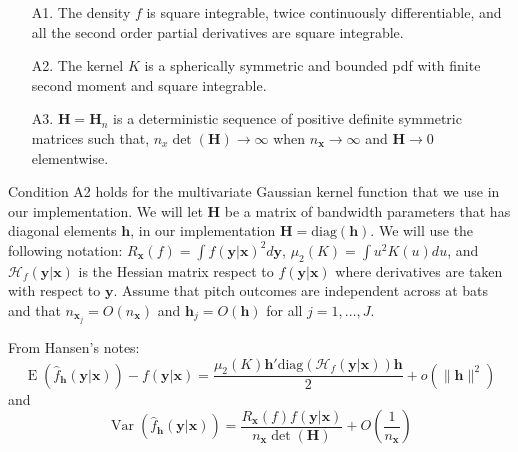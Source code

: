 \documentclass[11pt]{article}
\newcommand{\Hcal}{\mathcal{H}}
\newcommand{\Hbf}{\textbf{H}}
\newcommand{\y}{\textbf{y}}
\newcommand{\x}{\textbf{x}}
\newcommand{\h}{\textbf{h}}
\DeclareMathOperator{\E}{E}
\DeclareMathOperator{\Var}{Var}
\begin{document}
\begin{itemize}
\item[A1.] The density $f$ is square integrable, twice continuously differentiable, and all the second order partial derivatives are square integrable.
\item[A2.] The kernel $K$ is a spherically symmetric and bounded pdf with finite second moment and square integrable.
\item[A3.] $\Hbf = \Hbf_n$ is a deterministic sequence of positive definite symmetric matrices such that, $n_x\det(\Hbf) \to \infty$ when $n_\x \to \infty$ and $\Hbf \to 0$ elementwise. 
\end{itemize}

Condition A2 holds for the multivariate Gaussian kernel function that we use in our implementation.
We will let $\Hbf$ be a matrix of bandwidth parameters that has diagonal elements $\h$, in our implementation $\Hbf = \text{diag}(\h)$. We will use the following notation: $R_{\x}(f) = \int f(\y|\x)^2 d\y$, $\mu_2(K) = \int u^2K(u)du$, and $\Hcal_f(\y|\x)$ is the Hessian matrix respect to $f(\y|\x)$ where derivatives are taken with respect to $\y$. Assume that pitch outcomes are independent across at bats and that $n_{\x_j} = O(n_\x)$ and $\h_j = O(\h)$ for all $j = 1,\ldots,J$. 

From Hansen's notes: 
$$
  \E(\hat f_\h(\y|\x)) - f(\y|\x) = \frac{\mu_2(K)\h'\text{diag}(\Hcal_f(\y|\x))\h}{2} 
    + o(\|\h\|^2)
$$
and
$$
 \Var(\hat f_\h(\y|\x)) = \frac{R_{\x}(f)f(\y|\x)}{n_\x\det(\Hbf)} + O\left(\frac{1}{n_\x}\right)
$$
\end{document}
